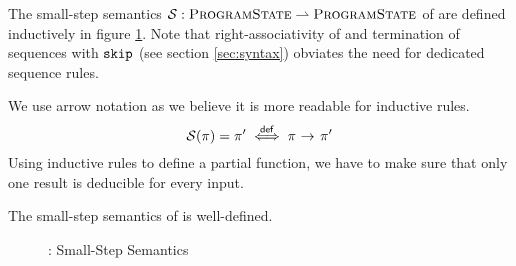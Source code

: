 The small-step semantics $\mathcal{S} : \textup{\textsc{ProgramState}} \rightharpoonup \textup{\textsc{ProgramState}}$ of \svlidf are defined inductively in figure \ref{fig:svl-sem-dyn-sstep}.
Note that right-associativity of \ttt{;} and termination of sequences with $\textup{\texttt{skip}}$ (see section \ref{sec:syntax}) obviates the need for dedicated sequence rules.

We use arrow notation as we believe it is more readable for inductive rules.
\begin{displaymath}
\mathcal{S}(\pi) = \pi' \overset{\textup{\textsf{def}}}{\iff} {\pi} \,\,{\rightarrow^{}}\,\, {\pi'}
\end{displaymath}
Using inductive rules to define a partial function, we have to make sure that only one result is deducible for every input.
\begin{lemma}
    The small-step semantics of \svlidf is well-defined.
\end{lemma}

\begin{figure}
    \boxed{\sstep{\pi}{\pi}}
    
    \caption{\svlidf: Small-Step Semantics}
    \label{fig:svl-sem-dyn-sstep}
\end{figure}


